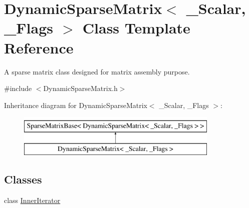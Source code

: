 \hypertarget{class_dynamic_sparse_matrix}{\section{Dynamic\-Sparse\-Matrix$<$ \-\_\-\-Scalar, \-\_\-\-Flags $>$ Class Template Reference}
\label{class_dynamic_sparse_matrix}
}


A sparse matrix class designed for matrix assembly purpose.  




{\ttfamily \#include $<$Dynamic\-Sparse\-Matrix.\-h$>$}

Inheritance diagram for Dynamic\-Sparse\-Matrix$<$ \-\_\-\-Scalar, \-\_\-\-Flags $>$\-:\begin{figure}[H]
\begin{center}
\leavevmode
\includegraphics[height=2.000000cm]{class_dynamic_sparse_matrix}
\end{center}
\end{figure}
\subsection*{Classes}
\begin{DoxyCompactItemize}
\item 
class \hyperlink{class_dynamic_sparse_matrix_1_1_inner_iterator}{Inner\-Iterator}
\end{DoxyCompactItemize}

